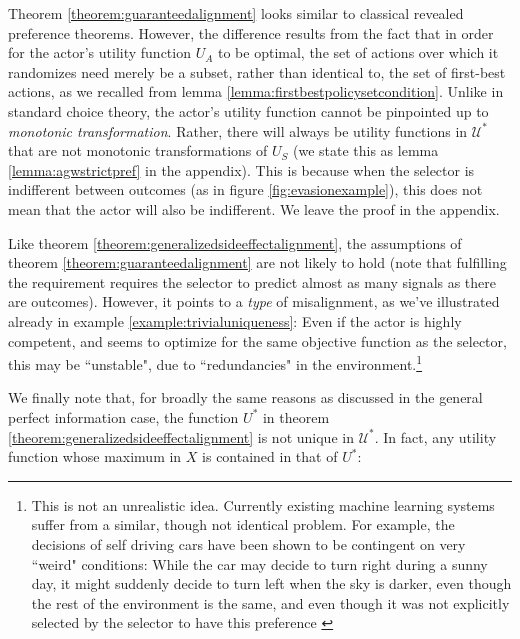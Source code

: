 \begin{remark*}
	\textnormal{Theorem \ref{theorem:guaranteedalignment} looks similar to classical revealed preference theorems. However, the difference results from the fact that in order for the actor's utility function $U_A$ to be optimal, the set of actions over which it randomizes need merely be a subset, rather than identical to, the set of first-best actions, as we recalled from lemma \ref{lemma:firstbestpolicysetcondition}. Unlike in standard choice theory, the actor's utility function cannot be pinpointed up to \textit{monotonic transformation}. Rather, there will always be utility functions in $\mathcal U^*$ that are not monotonic transformations of $U_S$ (we state this as lemma \ref{lemma:agwstrictpref} in the appendix). This is because when the selector is indifferent between outcomes (as in figure \ref{fig:evasionexample}), this does not mean that the actor will also be indifferent. We leave the proof in the appendix.}
\end{remark*}

\begin{remark*}
	\textnormal{Like theorem \ref{theorem:generalizedsideeffectalignment}, the assumptions of theorem \ref{theorem:guaranteedalignment} are not likely to hold (note that fulfilling the requirement requires the selector to predict almost as many signals as there are outcomes). However, it points to a \textit{type} of misalignment, as we've illustrated already in example \ref{example:trivialuniqueness}: Even if the actor is highly competent, and seems to optimize for the same objective function as the selector, this may be ``unstable", due to ``redundancies" in the environment.\footnote{This is not an unrealistic idea. Currently existing machine learning systems suffer from a similar, though not identical problem. For example, the decisions of self driving cars have been shown to be contingent on very ``weird" conditions: While the car may decide to turn right during a sunny day, it might suddenly decide to turn left when the sky is darker, even though the rest of the environment is the same, and even though it was not explicitly selected by the selector to have this preference  \citep{Pei2017,Huang2017}} }
\end{remark*}

We finally note that, for broadly the same reasons as discussed in the general perfect information case, the function $U^*$ in theorem \ref{theorem:generalizedsideeffectalignment} is not unique in $\mathcal U^*$. In fact, any utility function whose maximum in $X$ is contained in that of $U^*$:

